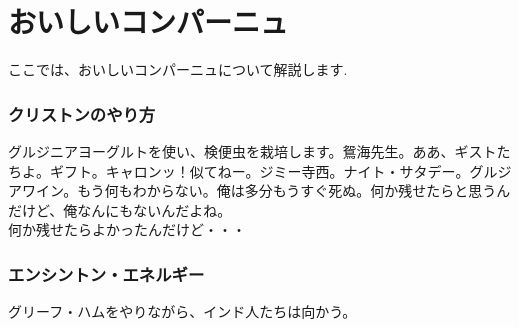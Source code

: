 \documentclass[fleqn,leqno,autodetect-engine,dvipdfmxi-if-dvi,ja=standard]{bxjsarticle}
\begin{document}
\part{おいしいコンパーニュ}
ここでは、おいしいコンパーニュについて解説します.

\section{クリストンのやり方}
グルジニアヨーグルトを使い、検便虫を栽培します。鴛海先生。ああ、ギストたちよ。ギフト。キャロンッ！似てねー。ジミー寺西。ナイト・サタデー。グルジアワイン。もう何もわからない。俺は多分もうすぐ死ぬ。何か残せたらと思うんだけど、俺なんにもないんだよね。\\

何か残せたらよかったんだけど・・・

\section{エンシントン・エネルギー}
グリーフ・ハムをやりながら、インド人たちは向かう。
\end{document}
